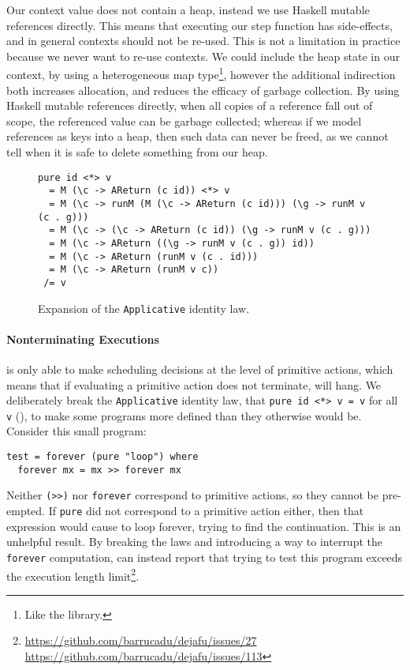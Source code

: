 Our context value does not contain a heap, instead we use Haskell mutable
references directly.  This means that executing our step function has
side-effects, and in general contexts should not be re-used.  This is not a
limitation in practice because we never want to re-use contexts.  We could
include the heap state in our context, by using a heterogeneous map
type\footnote{Like the  library.}, however the additional
indirection both increases allocation, and reduces the efficacy of garbage
collection.  By using Haskell mutable references directly, when all copies of a
reference fall out of scope, the referenced value can be garbage collected;
whereas if we model references as keys into a heap, then such data can never be
freed, as we cannot tell when it is safe to delete something from our heap.

\begin{figure}[t]
  \centering
\begin{lstlisting}
pure id <*> v
  = M (\c -> AReturn (c id)) <*> v
  = M (\c -> runM (M (\c -> AReturn (c id))) (\g -> runM v (c . g)))
  = M (\c -> (\c -> AReturn (c id)) (\g -> runM v (c . g)))
  = M (\c -> AReturn ((\g -> runM v (c . g)) id))
  = M (\c -> AReturn (runM v (c . id)))
  = M (\c -> AReturn (runM v c))
 /= v
\end{lstlisting}
  \caption{Expansion of the \texttt{Applicative} identity law.}
  \label{fig:areturn}
\end{figure}

\paragraph{Nonterminating Executions}
\dejafu{} is only able to make scheduling decisions at the level of primitive
actions, which means that if evaluating a primitive action does not terminate,
\dejafu{} will hang.  We deliberately break the \verb|Applicative| identity law,
that \verb|pure id <*> v = v| for all \verb|v| (), to make some
programs more defined than they otherwise would be.  Consider this small
program:

\begin{lstlisting}
test = forever (pure "loop") where
  forever mx = mx >> forever mx
\end{lstlisting}

Neither \verb|(>>)| nor \verb|forever| correspond to primitive actions, so they
cannot be pre-empted.  If \verb|pure| did not correspond to a primitive action
either, then that expression would cause \dejafu{} to loop forever, trying to
find the continuation.  This is an unhelpful result.  By breaking the laws and
introducing a way to interrupt the \verb|forever| computation, \dejafu{} can
instead report that trying to test this program exceeds the execution length
limit\footnote{\url{https://github.com/barrucadu/dejafu/issues/27}\\\url{https://github.com/barrucadu/dejafu/issues/113}}.


